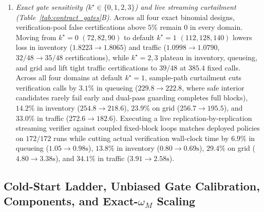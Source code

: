 \begin{enumerate}
  \item \emph{Exact gate sensitivity ($k^\star\in\{0,1,2,3\}$) and live streaming curtailment (Table~\ref{tab:contract_gates}B).} Across all four exact binomial designs, verification-pool false certifications above $5\%$ remain $0$ in every domain. Moving from $k^\star=0$ $(72,82,90)$ to default $k^\star=1$ $(112,128,140)$ lowers loss in inventory ($1.8223 \to 1.8065$) and traffic ($1.0998 \to 1.0790$, $32/48 \to 35/48$ certifications), while $k^\star=2,3$ plateau in inventory, queueing, and grid and lift tight traffic certifications to $39/48$ at $385.4$ fixed calls. Across all four domains at default $k^\star=1$, sample-path curtailment cuts verification calls by $3.1\%$ in queueing ($229.8 \to 222.8$, where safe interior candidates rarely fail early and dual-pass guarding completes full blocks), $14.2\%$ in inventory ($254.8 \to 218.6$), $23.9\%$ on grid ($256.7 \to 195.5$), and $33.0\%$ in traffic ($272.6 \to 182.6$). Executing a live replication-by-replication streaming verifier against coupled fixed-block loops matches deployed policies on $172/172$ runs while cutting actual verification wall-clock time by $6.9\%$ in queueing ($1.05\to 0.98\text{s}$), $13.8\%$ in inventory ($0.80\to 0.69\text{s}$), $29.4\%$ on grid ($4.80\to 3.38\text{s}$), and $34.1\%$ in traffic ($3.91\to 2.58\text{s}$).
\end{enumerate}



\subsection{Cold-Start Ladder, Unbiased Gate Calibration, Components, and Exact-$\omega_M$ Scaling}\label{sec:matched_results}\label{sec:terminal_replay}\label{sec:two_mechanisms_results}

